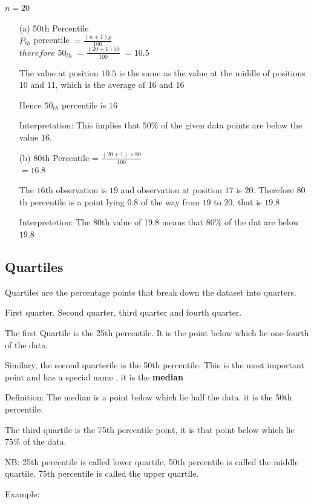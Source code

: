 \documentclass[12pt]{article}
\begin{document}
$n = 20$

\begin{enumerate}
    \item[(a)]50th Percentile \\ $P_{th}$ percentile $= \frac{(n + 1)p}{100}$\\
    $therefore$ $50_{th}$ $= \frac{(20 + 1)50}{100}$
    $= 10.5$

    The value at position $10.5$ is the same as the value at the middle of positions $10$ and $11$, which is the average of $16$ and $16$

    Hence $50_{th}$ percentile is $16$

    Interpretation: This implies that $50\%$ of the given data points are below the value $16$.
    \item[(b)] 80th Percentile = $\frac{(20 + 1)\times 80}{100}$ \\ $= 16.8$

        The $16$th observation is $19$ and observation at position $17$ is $20$. Therefore $80$th percentile is a point lying $0.8$ of the way from $19$ to $20$, that is $19.8$

        Interpretetion: The $80$th value of 19.8 means that $80\%$ of the dat are below $19.8$
\end{enumerate}

\subsection{Quartiles}
Quartiles are the percentage points that break down the dataset into quarters.

First quarter, Second quarter, third quarter and fourth quarter.

The first Quartile is the 25th percentile. It is the point below which lie one-fourth of the data.

Similary, the second quarterile is the 50th percentile. This is the most important point and has a special name , it is the \textbf{median}

Definition: The median is a point below which lie half the data. it is the 50th percentile.

The third quartile is the 75th percentile point, it is that point below which lie $75\%$ of the data.

NB: 25th percentile is called lower quartile, 50th percentile is called the middle quartile. 75th percentile is called the upper quartile.

Example:
\end{document}
